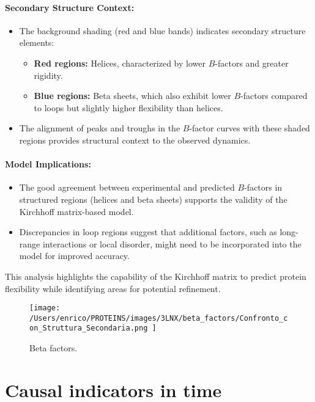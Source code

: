 \documentclass[English, Lau, oneside]{sapthesis}
\begin{document}
\paragraph{Secondary Structure Context:}
\begin{itemize}
    \item The background shading (red and blue bands) indicates secondary structure elements:
    \begin{itemize}
        \item \textbf{Red regions:} Helices, characterized by lower \( B \)-factors and greater rigidity.
        \item \textbf{Blue regions:} Beta sheets, which also exhibit lower \( B \)-factors compared to loops but slightly higher flexibility than helices.
    \end{itemize}
    \item The alignment of peaks and troughs in the \( B \)-factor curves with these shaded regions provides structural context to the observed dynamics.
\end{itemize}

\paragraph{Model Implications:}
\begin{itemize}
    \item The good agreement between experimental and predicted \( B \)-factors in structured regions (helices and beta sheets) supports the validity of the Kirchhoff matrix-based model.
    \item Discrepancies in loop regions suggest that additional factors, such as long-range interactions or local disorder, might need to be incorporated into the model for improved accuracy.
\end{itemize}

This analysis highlights the capability of the Kirchhoff matrix to predict protein flexibility while identifying areas for potential refinement.
\begin{figure}[h!]
    \centering
    \texttt{[image: /Users/enrico/PROTEINS/images/3LNX/beta\_factors/Confronto\_con\_Struttura\_Secondaria.png
    ]}
    \caption{Beta factors.}
\end{figure}



\newpage
\section*{Causal indicators in time}
\end{document}
